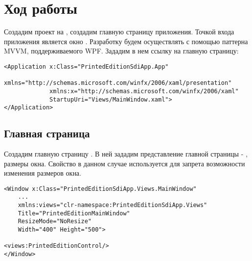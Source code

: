 \documentclass[a4paper,14pt]{extarticle}
\begin{document}
\section{Ход работы}
Создадим  проект на , создадим главную
страницу приложения. Точкой входа приложения является окно .
Разработку будем осуществлять с помощью паттерна MVVM, поддерживаемого WPF.
Зададим в нем ссылку на главную страницу:
\begin{lstlisting}
<Application x:Class="PrintedEditionSdiApp.App"
             xmlns="http://schemas.microsoft.com/winfx/2006/xaml/presentation"
             xmlns:x="http://schemas.microsoft.com/winfx/2006/xaml"
             StartupUri="Views/MainWindow.xaml">
</Application>
\end{lstlisting}

\subsection{Главная страница}
Создадим главную страницу . В ней зададим представление
главной страницы - , размеры окна. Свойство
 в данном случае используется для запрета возможности
изменения размеров окна.
\begin{lstlisting}
<Window x:Class="PrintedEditionSdiApp.Views.MainWindow"
    ...
    xmlns:views="clr-namespace:PrintedEditionSdiApp.Views"
    Title="PrintedEditionMainWindow"
    ResizeMode="NoResize"
    Width="400" Height="500">

<views:PrintedEditionControl/>
</Window>
\end{lstlisting}
\end{document}
